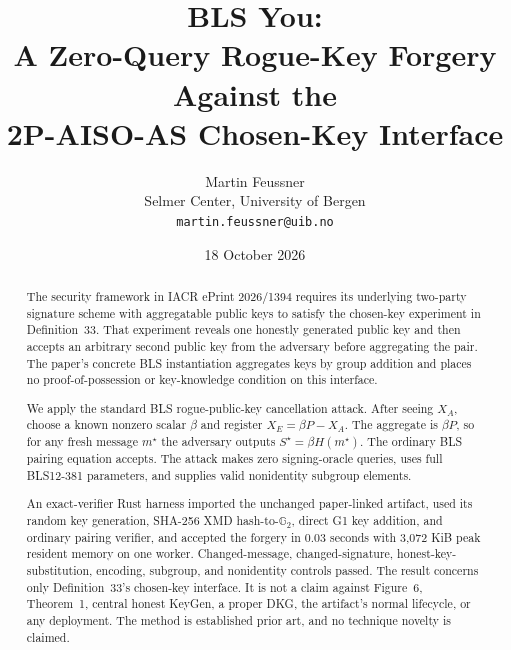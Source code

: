 \documentclass[10pt,a4paper]{article}
\title{\bfseries BLS You:\\
A Zero-Query Rogue-Key Forgery Against the\\
2P-AISO-AS Chosen-Key Interface}
\author{Martin Feussner\\
\small Selmer Center, University of Bergen\\
\small \texttt{martin.feussner@uib.no}}
\date{18 October 2026}
\newcommand{\GTwo}{\mathbb{G}_2}
\begin{document}
\maketitle

\noindent{}

\begin{abstract}
The security framework in IACR ePrint 2026/1394 requires its underlying
two-party signature scheme with aggregatable public keys to satisfy the
chosen-key experiment in Definition~33. That experiment reveals one honestly
generated public key and then accepts an arbitrary second public key from the
adversary before aggregating the pair. The paper's concrete BLS instantiation
aggregates keys by group addition and places no proof-of-possession or
key-knowledge condition on this interface.

We apply the standard BLS rogue-public-key cancellation attack. After seeing
$X_A$, choose a known nonzero scalar $\beta$ and register
$X_E=\beta P-X_A$. The aggregate is $\beta P$, so for any fresh message
$m^\star$ the adversary outputs $S^\star=\beta H(m^\star)$. The ordinary BLS
pairing equation accepts. The attack makes zero signing-oracle queries, uses
full BLS12-381 parameters, and supplies valid nonidentity subgroup elements.

An exact-verifier Rust harness imported the unchanged paper-linked artifact,
used its random key generation, SHA-256 XMD hash-to-$\GTwo$, direct G1 key
addition, and ordinary pairing verifier, and accepted the forgery in 0.03
seconds with 3,072 KiB peak resident memory on one worker. Changed-message,
changed-signature, honest-key-substitution, encoding, subgroup, and
nonidentity controls passed. The result concerns only Definition~33's
chosen-key interface. It is not a claim against Figure~6, Theorem~1, central
honest \textsf{KeyGen}, a proper DKG, the artifact's normal lifecycle, or any
deployment. The method is established prior art, and no technique novelty is
claimed.
\end{abstract}
\end{document}
